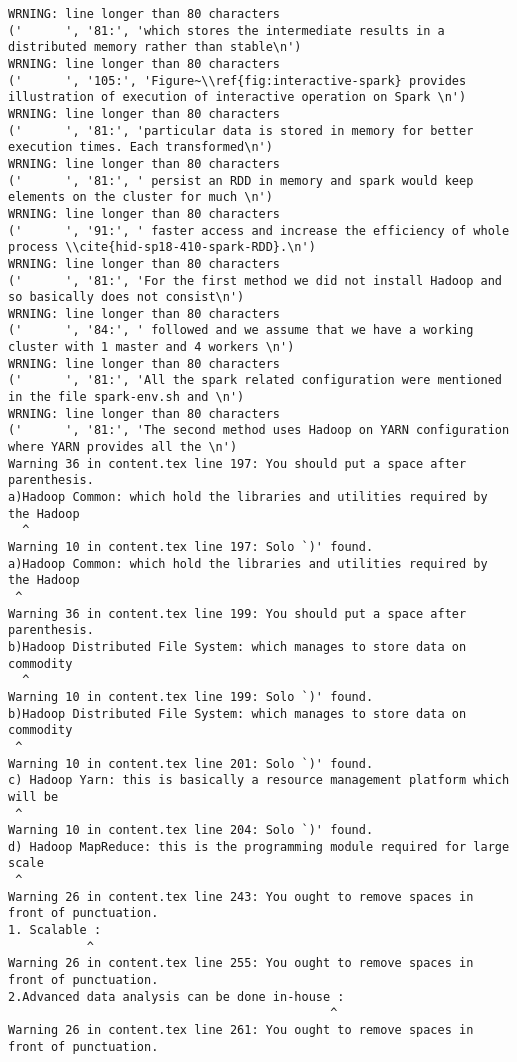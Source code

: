 \begin{tiny}
\begin{verbatim}
WRNING: line longer than 80 characters
('      ', '81:', 'which stores the intermediate results in a distributed memory rather than stable\n')
WRNING: line longer than 80 characters
('      ', '105:', 'Figure~\\ref{fig:interactive-spark} provides illustration of execution of interactive operation on Spark \n')
WRNING: line longer than 80 characters
('      ', '81:', 'particular data is stored in memory for better execution times. Each transformed\n')
WRNING: line longer than 80 characters
('      ', '81:', ' persist an RDD in memory and spark would keep elements on the cluster for much \n')
WRNING: line longer than 80 characters
('      ', '91:', ' faster access and increase the efficiency of whole process \\cite{hid-sp18-410-spark-RDD}.\n')
WRNING: line longer than 80 characters
('      ', '81:', 'For the first method we did not install Hadoop and so basically does not consist\n')
WRNING: line longer than 80 characters
('      ', '84:', ' followed and we assume that we have a working cluster with 1 master and 4 workers \n')
WRNING: line longer than 80 characters
('      ', '81:', 'All the spark related configuration were mentioned in the file spark-env.sh and \n')
WRNING: line longer than 80 characters
('      ', '81:', 'The second method uses Hadoop on YARN configuration where YARN provides all the \n')
Warning 36 in content.tex line 197: You should put a space after parenthesis.
a)Hadoop Common: which hold the libraries and utilities required by the Hadoop   
  ^
Warning 10 in content.tex line 197: Solo `)' found.
a)Hadoop Common: which hold the libraries and utilities required by the Hadoop   
 ^
Warning 36 in content.tex line 199: You should put a space after parenthesis.
b)Hadoop Distributed File System: which manages to store data on commodity   
  ^
Warning 10 in content.tex line 199: Solo `)' found.
b)Hadoop Distributed File System: which manages to store data on commodity   
 ^
Warning 10 in content.tex line 201: Solo `)' found.
c) Hadoop Yarn: this is basically a resource management platform which will be   
 ^
Warning 10 in content.tex line 204: Solo `)' found.
d) Hadoop MapReduce: this is the programming module required for large scale   
 ^
Warning 26 in content.tex line 243: You ought to remove spaces in front of punctuation.
1. Scalable :   
           ^
Warning 26 in content.tex line 255: You ought to remove spaces in front of punctuation.
2.Advanced data analysis can be done in-house :   
                                             ^
Warning 26 in content.tex line 261: You ought to remove spaces in front of punctuation.

\end{verbatim}
\end{tiny}
